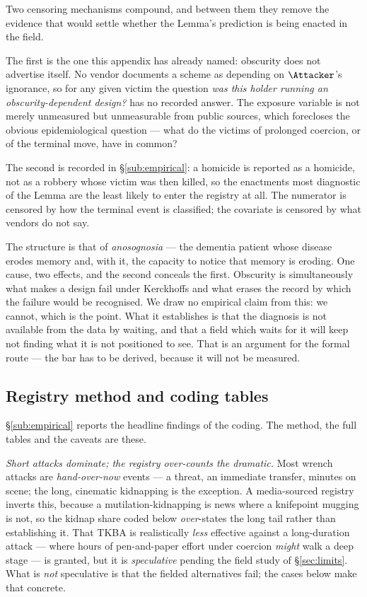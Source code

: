 \begin{remark}
\label{rem:anosognosia}
Two censoring mechanisms compound, and between them they remove the evidence that
would settle whether the Lemma's prediction is being enacted in the field.

The first is the one this appendix has already named: obscurity does not advertise
itself. No vendor documents a scheme as depending on $\Attacker$'s ignorance, so
for any given victim the question \emph{was this holder running an
obscurity-dependent design?} has no recorded answer. The exposure variable is not
merely unmeasured but unmeasurable from public sources, which forecloses the
obvious epidemiological question --- what do the victims of prolonged coercion, or
of the terminal move, have in common?

The second is recorded in \S\ref{sub:empirical}: a homicide is reported as a
homicide, not as a robbery whose victim was then killed, so the enactments most
diagnostic of the Lemma are the least likely to enter the registry at all. The
numerator is censored by how the terminal event is classified; the covariate is
censored by what vendors do not say.

The structure is that of \emph{anosognosia} --- the dementia patient whose disease
erodes memory and, with it, the capacity to notice that memory is eroding. One
cause, two effects, and the second conceals the first. Obscurity is simultaneously
what makes a design fail under Kerckhoffs and what erases the record by which the
failure would be recognised. We draw no empirical claim from this: we cannot,
which is the point. What it establishes is that the diagnosis is not available
from the data by waiting, and that a field which waits for it will keep not
finding what it is not positioned to see. That is an argument for the formal
route --- the bar has to be derived, because it will not be measured.
\end{remark}

\subsection{Registry method and coding tables}
\label{app:classify-registry}

\noindent \S\ref{sub:empirical} reports the headline findings of the coding. The
method, the full tables and the caveats are these.

\emph{Short attacks dominate; the registry over-counts the dramatic.} Most wrench
attacks are \emph{hand-over-now} events --- a threat, an immediate transfer, minutes
on scene; the long, cinematic kidnapping is the exception. A media-sourced registry
inverts this, because a mutilation-kidnapping is news where a knifepoint mugging is
not, so the kidnap share coded below \emph{over}-states the long tail rather than
establishing it. That TKBA is realistically \emph{less} effective against a
long-duration attack --- where hours of pen-and-paper effort under coercion
\emph{might} walk a deep stage --- is granted, but it is \emph{speculative} pending
the field study of \S\ref{sec:limits}. What is \emph{not} speculative is that the
fielded alternatives fail; the cases below make that concrete.

